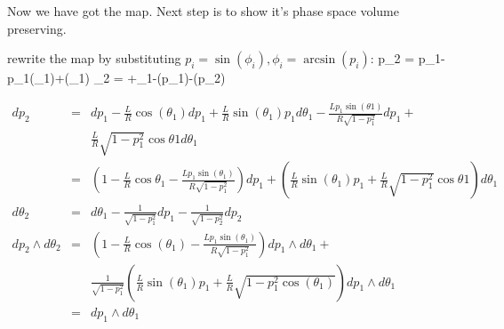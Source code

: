 {Now we have got the map. Next step is to show it's phase space volume preserving.

rewrite the map by substituting $p_{i} = \sin(\phi_{i}),\phi_{i} = \arcsin(p_{i})$:
\beq p_{2} = p_{1}-p_{1}\cos(\theta_{1})+\sin(\theta_{1}) \eeq
\beq \theta_{2} = \pi+\theta_{1}-\arcsin(p_{1})-\arcsin(p_{2}) \eeq

\begin{eqnarray}
dp_{2}&=&dp_{1}-\frac{L}{R}\cos(\theta_{1})dp_{1}+\frac{L}{R}\sin(\theta_{1})p_{1}d\theta_{1}-
\frac{Lp_{1}\sin(\theta{1})}{R\sqrt{1-p_{1}^{2}}}dp_{1}+
\\\nonumber&&\frac{L}{R}\sqrt{1-p_{1}^{2}}\cos{\theta{1}}d\theta_{1}\\\nonumber
&=&(1-\frac{L}{R}\cos{\theta_{1}}-\frac{Lp_{1}\sin(\theta_{1})}{R\sqrt{1-p_{1}^{2}}})dp_{1}
+(\frac{L}{R}\sin(\theta_{1})p_{1}+\frac{L}{R}\sqrt{1-p_{1}^{2}}\cos{\theta{1}})d\theta_{1}\\\nonumber
d\theta_{2}&=&d\theta_{1}-\frac{1}{\sqrt{1-p_{1}^{2}}}dp_{1}-\frac{1}{\sqrt{1-p_{2}^{2}}}dp_{2}\\\nonumber
dp_{2}\wedge d\theta_{2}&=& (1-\frac{L}{R}\cos(\theta_{1})-\frac{Lp_{1}\sin(\theta_{1})}{R\sqrt{1-p_{1}^{2}}})dp_{1}{\wedge}d\theta_{1}+
\\&&\frac{1}{\sqrt{1-p_{1}^{2}}}(\frac{L}{R}\sin(\theta_{1})p_{1}
+\frac{L}{R}\sqrt{1-p_{1}^{2}\cos(\theta_{1})})dp_{1}\wedge d\theta_{1}\\\nonumber
&=&dp_{1}\wedge d\theta_{1}
\end{eqnarray}
    }%